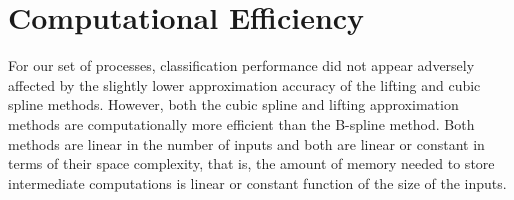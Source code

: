 
 
\section{Computational Efficiency}

 For our set of processes, classification performance did not appear adversely affected by the slightly lower approximation accuracy of the lifting and cubic spline methods. However, both the cubic spline and lifting approximation methods are computationally more efficient than the B-spline method. Both methods are linear in the number of inputs and both are linear or constant in terms of their space complexity, that is, 
the amount of memory needed to store intermediate computations is linear or constant function of the size of the inputs. 

